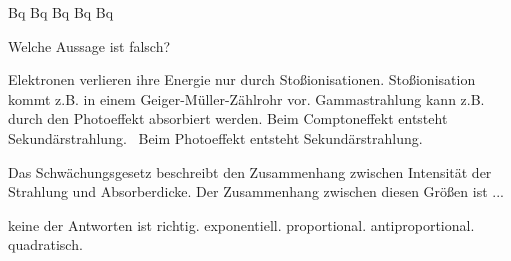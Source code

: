 \documentclass[11pt]{exam}
\begin{document}
\begin{questions}
\begin{choices}
	 Bq
	 Bq
	 Bq
	 Bq
	 Bq
\end{choices}

\vspace{3mm}\question Welche Aussage ist falsch?

\begin{choices}
	\choice Elektronen verlieren ihre Energie nur durch Stoßionisationen.
	\choice Stoßionisation kommt z.B. in einem Geiger-Müller-Zählrohr vor.
	\choice Gammastrahlung kann z.B. durch den Photoeffekt absorbiert werden.
	\choice Beim Comptoneffekt entsteht Sekundärstrahlung.
	\choice  Beim Photoeffekt entsteht Sekundärstrahlung.
\end{choices}

\vspace{3mm}\question Das Schwächungsgesetz beschreibt den Zusammenhang zwischen Intensität der Strahlung und Absorberdicke. Der Zusammenhang zwischen diesen Größen ist ...

\begin{choices}
	\choice keine der Antworten ist richtig.
	\choice exponentiell.
	\choice proportional.
	\choice antiproportional.
	\choice quadratisch.
\end{choices}

\vspace{3mm}\end{questions}
\end{document}
